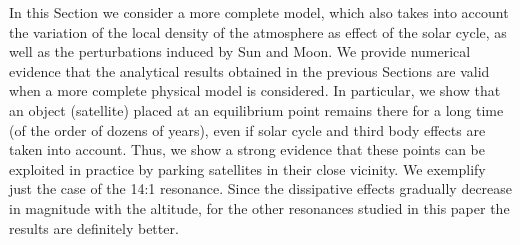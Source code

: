 \documentclass[12pt,reqno]{amsart}
\numberwithin{equation}{section}
\begin{document}





In this Section we consider a more complete model, which also takes into account the variation of the local density of the atmosphere as effect of the solar cycle, as well as the perturbations induced by
Sun and Moon. We provide numerical evidence that the analytical results obtained in the previous Sections are valid when a more complete physical model is considered. In particular, we
show that an object (satellite)
placed at an equilibrium point remains there for a long time (of the order of dozens of years), even if solar cycle and third body effects are
taken into account. Thus, we show a strong evidence that these points can be exploited in practice by parking satellites in their close vicinity. We exemplify just the case of the 14:1 resonance. Since the dissipative effects gradually decrease in magnitude with the altitude, for the other resonances studied in this paper the results are definitely better.
\end{document}

